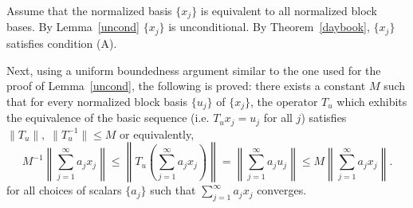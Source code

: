 \documentclass[12pt]{report}
\begin{document}
Assume that the normalized basis $\{x_j\}$ is equivalent to all normalized block bases.
By Lemma~\ref{uncond} $\{x_j\}$ is unconditional.
By Theorem~\ref{daybook}, $\{x_j\}$ satisfies condition (A).

Next, using a uniform 
boundedness argument similar to the one used for the proof of Lemma~\ref{uncond},
the following is proved:  there exists a constant $M$ such that for every 
normalized block basis $\{u_j\}$ of $\{x_j\}$,
the operator $T_u$ which exhibits the equivalence of the basic sequence (i.e. 
$T_u x_j = u_j$ for all $j$) satisfies $\|T_u\|,\;\|T_u^{-1}\| \leq M$ or equivalently,
\begin{equation}\label{star}
M^{-1}\left\|\sum_{j=1}^\infty a_j x_j\right\| \leq
\left\|T_u\left(\sum_{j=1}^\infty a_j x_j\right)\right\| 
= \left\|\sum_{j=1}^\infty a_j u_j\right\| \leq M\left\|\sum_{j=1}^\infty a_j x_j\right\|.
\end{equation}
for all choices of scalars $\{a_j\}$ such that $\sum_{j=1}^\infty a_j x_j$ converges.
\end{document}
